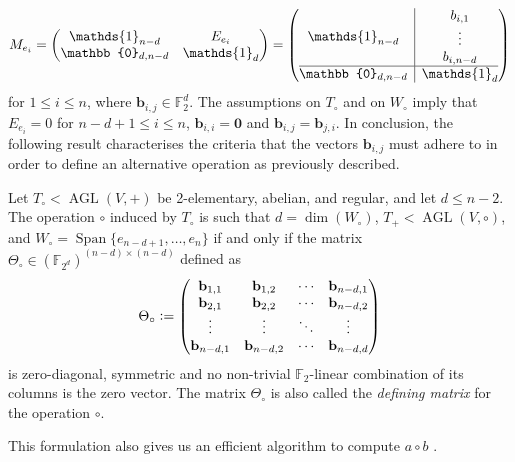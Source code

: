 \documentclass[runningheads,a4paper,english]{llncs}
\newcommand{\F}{\mathbb{F}}
\DeclareMathOperator{\agl}{AGL}
\DeclareMathOperator{\AGL}{AGL}
\DeclareMathOperator{\spn}{Span}
\newcommand{\defeq}{\vcentcolon=}
\newcommand{\ind}[1]{\mathds{1}_{#1}}
\renewcommand{\b}{\textbf{b}}
\newcommand{\wo}{W_\circ}
\begin{document}
\[ 
M_{e_i} =
\begin{pmatrix}
\ind{n-d} & E_{e_i} \\
\mathbb{0}_{d, n-d} & \ind{d}
\end{pmatrix}
=
\left(\begin{array}{@{}c|c@{}}
   	\ind{n-d} & 
   	\begin{matrix}
   	\b_{i,1} \\
   	\vdots \\
   	\b_{i, n-d}
   	\end{matrix} \\
   	\hline
   	\mathbb{0}_{d, n-d} & \ind{d}
\end{array}\right)
\]
for $1 \leq i \leq n$, where $\b_{i,j} \in \F_2^d$. The assumptions on $T_\circ$ and on $W_\circ$ imply that $E_{e_i} = 0$ for $n-d+1 \leq i \leq n$, $\b_{i,i} = \textbf{0}$ and $\b_{i,j} = \b_{j,i}$. In conclusion, the following result characterises the criteria that the vectors $\b_{i,j}$ must adhere to in order to define an alternative operation as previously described.
\begin{theorem}
	\label{thm:theta}
	Let $T_\circ < \AGL(V, +)$ be 2-elementary, abelian, and regular, and let $d \leq n-2$. The operation $\circ$ induced by $T_\circ$ is such that $d = \dim(\wo)$, $T_+ < \agl(V, \circ)$, and $W_\circ = \spn\{e_{n-d+1},\dots,e_n \}$ 
	if and only if the  matrix $\Theta_\circ \in (\F_{2^d})^{(n-d)\times (n-d)}$ defined as 
	\[
	\Theta_\circ \defeq 
	\begin{pmatrix}
		\mathbf{b}_{1,1} & \mathbf b_{1,2} & \cdots & \mathbf b_{n-d, 1} \\
		\mathbf b_{2,1} & \mathbf b_{2,2} & \cdots & \mathbf b_{n-d, 2} \\
		\vdots & \vdots & \ddots & \vdots \\
		\mathbf b_{n-d, 1} & \mathbf b_{n-d, 2} & \cdots & \mathbf b_{n-d, d}
	\end{pmatrix}
	\]
	is zero-diagonal, symmetric and no non-trivial $\mathbb F_2$-linear combination of its columns is the zero vector.
	The matrix $\Theta_\circ$ is also called the \emph{defining matrix} for the operation $\circ$.
\end{theorem}
This formulation also gives us an efficient algorithm to compute $a \circ b$ \cite{civino2019differential}. \\
\end{document}
